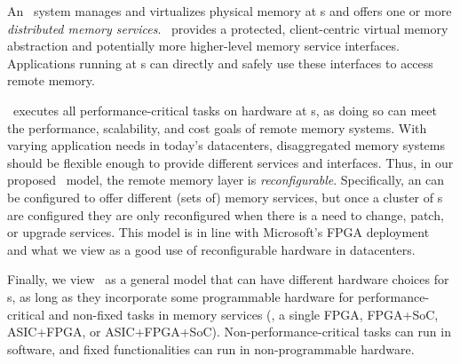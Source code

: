An \phdm\ system manages and virtualizes physical memory at \MN{}s
and offers one or more {\em distributed memory services}.
\phdm\ provides a protected, client-centric virtual memory abstraction 
and potentially more higher-level memory service interfaces.
Applications running at \CN{}s can directly and safely use these interfaces to access remote memory. %

\phdm\ executes all performance-critical tasks on hardware at \MN{}s,
as doing so can meet the performance, scalability, and cost goals of remote memory systems.
With varying application needs in today's datacenters,
disaggregated memory systems should be flexible enough to provide different services and interfaces.
Thus, in our proposed \phdm\ model, the remote memory layer is {\em reconfigurable}.
Specifically, an \MN{} can be configured to offer different (sets of) memory services,
but once a cluster of \MN{}s are configured they are only reconfigured when 
there is a need to change, patch, or upgrade services.
This model is in line with Microsoft's FPGA deployment~\cite{Catapult}
and what we view as a good use of reconfigurable hardware in datacenters.

Finally, we view \phdm\ as a general model that can have different hardware choices for \MN{}s,
as long as they incorporate some programmable hardware for performance-critical and non-fixed tasks in memory services
(\eg, a single FPGA, FPGA+SoC, ASIC+FPGA, or ASIC+FPGA+SoC).
Non-performance-critical tasks can run in software, and fixed functionalities can run in non-programmable hardware.
\fi


